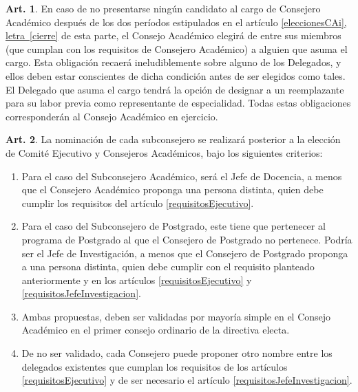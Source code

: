 \documentclass[letterpaper,11pt]{article}
\theoremstyle{definition}%
\newtheorem{art}{Art.} %
\newcommand{\aaref}[2]{\hyperref[#2]{\ref*{#1}, letra~\ref*{#2}}}
\begin{document}
\begin{art}\label{eleccionExtraordinariaCAPregrado}
	En caso de no presentarse ningún candidato al cargo de Consejero Académico después de los dos períodos estipulados en el artículo \aaref{eleccionesCAi}{cierre} de esta parte, el Consejo Académico elegirá de entre sus miembros (que cumplan con los requisitos de Consejero Académico) a alguien que asuma el cargo. Esta obligación recaerá ineludiblemente sobre alguno de los Delegados, y ellos deben estar conscientes de dicha condición antes de ser elegidos como tales. El Delegado que asuma el cargo tendrá la opción de designar a un reemplazante para su labor previa como representante de especialidad. Todas estas obligaciones corresponderán al Consejo Académico en ejercicio.
\end{art}

\begin{art}\label{nominacionSubconsejeros}
	La nominación de cada subconsejero se realizará posterior a la elección de Comité Ejecutivo y Consejeros Académicos, bajo los siguientes criterios:
	\begin{enumerate}
		\item Para el caso del Subconsejero Académico, será el Jefe de Docencia, a menos que el Consejero Académico proponga una persona distinta, quien debe cumplir los requisitos del artículo \ref{requisitosEjecutivo}.

		\item Para el caso del Subconsejero de Postgrado, este tiene que pertenecer al programa de Postgrado al que el Consejero de Postgrado no pertenece. Podría ser el Jefe de Investigación, a menos que el Consejero de Postgrado proponga a una persona distinta, quien debe cumplir con el requisito planteado anteriormente y en los artículos \ref{requisitosEjecutivo} y \ref{requisitosJefeInvestigacion}.

		\item Ambas propuestas, deben ser validadas por mayoría simple en el Consejo Académico en el primer consejo ordinario de la directiva electa.

		\item De no ser validado, cada Consejero puede proponer otro nombre entre los delegados existentes que cumplan los requisitos de los artículos \ref{requisitosEjecutivo} y de ser necesario el artículo \ref{requisitosJefeInvestigacion}.
	\end{enumerate}
\end{art}
\end{document}
